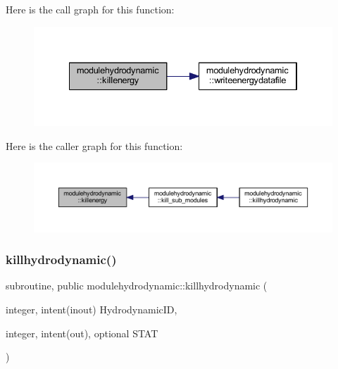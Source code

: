 Here is the call graph for this function\+:\nopagebreak
\begin{figure}[H]
\begin{center}
\leavevmode
\includegraphics[width=334pt]{namespacemodulehydrodynamic_a85ec37a513035b769326676058893ac1_cgraph}
\end{center}
\end{figure}
Here is the caller graph for this function\+:\nopagebreak
\begin{figure}[H]
\begin{center}
\leavevmode
\includegraphics[width=350pt]{namespacemodulehydrodynamic_a85ec37a513035b769326676058893ac1_icgraph}
\end{center}
\end{figure}
\mbox{\label{namespacemodulehydrodynamic_a0f3d902c6ac5d0beab910d09d6037271}} 
\subsubsection{\texorpdfstring{killhydrodynamic()}{killhydrodynamic()}}
{\footnotesize\ttfamily subroutine, public modulehydrodynamic\+::killhydrodynamic (\begin{DoxyParamCaption}\item[{integer, intent(inout)}]{Hydrodynamic\+ID,  }\item[{integer, intent(out), optional}]{S\+T\+AT }\end{DoxyParamCaption})}

